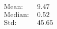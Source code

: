 \documentclass[preview]{standalone}
\begin{document}
\begin{align*}
\text{Mean: } &9.47\\\text{Median: } &0.52\\\text{Std: } &45.65
\end{align*}
\end{document}
